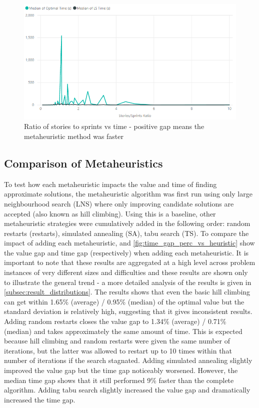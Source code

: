 \begin{figure}[h!]
    \centering
    \includegraphics[width=\textwidth]{Figures/FinalResults/annealing_time_stories_sprints.png}
     \caption{Ratio of stories to sprints vs time - positive gap means the metaheuristic method was faster}
     \label{fig:time_vs_stories_sprints}
\end{figure}

\FloatBarrier

\subsection{Comparison of Metaheuristics}

To test how each metaheuristic impacts the value and time of finding approximate solutions, the metaheuristic algorithm was first run using only large neighbourhood search (LNS) where only improving candidate solutions are accepted (also known as hill climbing). Using this is a baseline, other metaheuristic strategies were cumulatively added in the following order: random restarts (restarts), simulated annealing (SA), tabu search (TS). To compare the impact of adding each metaheuristic,  and \cref{fig:time_gap_perc_vs_heuristic} show the value gap and time gap (respectively) when adding each metaheuristic. It is important to note that these results are aggregated at a high level across problem instances of very different sizes and difficulties and these results are shown only to illustrate the general trend - a more detailed analysis of the results is given in \cref{subsec:result_distributions}. The results shows that even the basic hill climbing can get within 1.65\% (average) / 0.95\% (median) of the optimal value but the standard deviation is relatively high, suggesting that it gives inconsistent results. Adding random restarts closes the value gap to 1.34\% (average) / 0.71\% (median) and takes approximately the same amount of time. This is expected because hill climbing and random restarts were given the same number of iterations, but the latter was allowed to restart up to 10 times within that number of iterations if the search stagnated. Adding simulated annealing slightly improved the value gap but the time gap noticeably worsened. However, the median time gap shows that it still performed 9\% faster than the complete algorithm. Adding tabu search slightly increased the value gap and dramatically increased the time gap.

